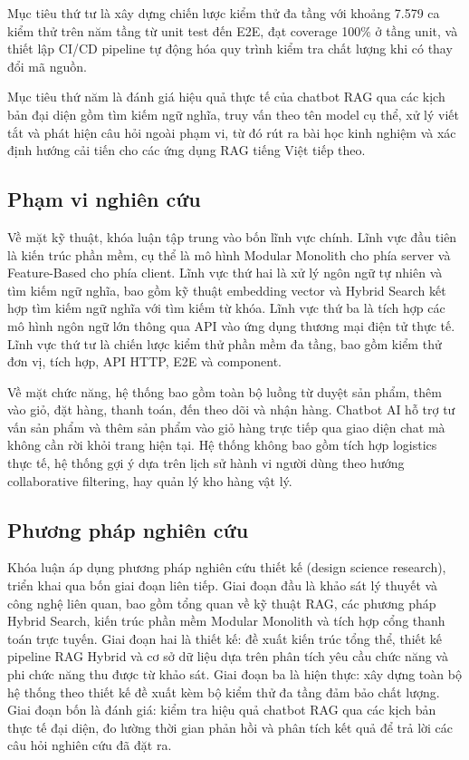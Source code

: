 Mục tiêu thứ tư là xây dựng chiến lược kiểm thử đa tầng với khoảng 7.579 ca kiểm thử trên năm tầng từ unit test đến E2E, đạt coverage 100\% ở tầng unit, và thiết lập CI/CD pipeline tự động hóa quy trình kiểm tra chất lượng khi có thay đổi mã nguồn.

Mục tiêu thứ năm là đánh giá hiệu quả thực tế của chatbot RAG qua các kịch bản đại diện gồm tìm kiếm ngữ nghĩa, truy vấn theo tên model cụ thể, xử lý viết tắt và phát hiện câu hỏi ngoài phạm vi, từ đó rút ra bài học kinh nghiệm và xác định hướng cải tiến cho các ứng dụng RAG tiếng Việt tiếp theo.

\subsection{Phạm vi nghiên cứu}

Về mặt kỹ thuật, khóa luận tập trung vào bốn lĩnh vực chính. Lĩnh vực đầu tiên là kiến trúc phần mềm, cụ thể là mô hình Modular Monolith cho phía server và Feature-Based cho phía client. Lĩnh vực thứ hai là xử lý ngôn ngữ tự nhiên và tìm kiếm ngữ nghĩa, bao gồm kỹ thuật embedding vector và Hybrid Search kết hợp tìm kiếm ngữ nghĩa với tìm kiếm từ khóa. Lĩnh vực thứ ba là tích hợp các mô hình ngôn ngữ lớn thông qua API vào ứng dụng thương mại điện tử thực tế. Lĩnh vực thứ tư là chiến lược kiểm thử phần mềm đa tầng, bao gồm kiểm thử đơn vị, tích hợp, API HTTP, E2E và component.

Về mặt chức năng, hệ thống bao gồm toàn bộ luồng từ duyệt sản phẩm, thêm vào giỏ, đặt hàng, thanh toán, đến theo dõi và nhận hàng. Chatbot AI hỗ trợ tư vấn sản phẩm và thêm sản phẩm vào giỏ hàng trực tiếp qua giao diện chat mà không cần rời khỏi trang hiện tại. Hệ thống không bao gồm tích hợp logistics thực tế, hệ thống gợi ý dựa trên lịch sử hành vi người dùng theo hướng collaborative filtering, hay quản lý kho hàng vật lý.

\subsection{Phương pháp nghiên cứu}

Khóa luận áp dụng phương pháp nghiên cứu thiết kế (design science research), triển khai qua bốn giai đoạn liên tiếp. Giai đoạn đầu là khảo sát lý thuyết và công nghệ liên quan, bao gồm tổng quan về kỹ thuật RAG, các phương pháp Hybrid Search, kiến trúc phần mềm Modular Monolith và tích hợp cổng thanh toán trực tuyến. Giai đoạn hai là thiết kế: đề xuất kiến trúc tổng thể, thiết kế pipeline RAG Hybrid và cơ sở dữ liệu dựa trên phân tích yêu cầu chức năng và phi chức năng thu được từ khảo sát. Giai đoạn ba là hiện thực: xây dựng toàn bộ hệ thống theo thiết kế đề xuất kèm bộ kiểm thử đa tầng đảm bảo chất lượng. Giai đoạn bốn là đánh giá: kiểm tra hiệu quả chatbot RAG qua các kịch bản thực tế đại diện, đo lường thời gian phản hồi và phân tích kết quả để trả lời các câu hỏi nghiên cứu đã đặt ra.

